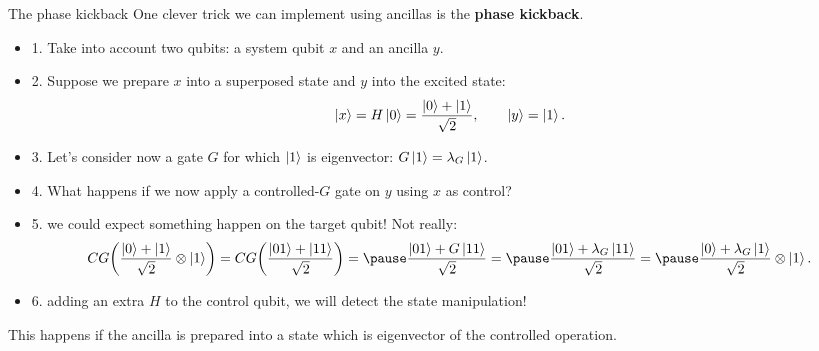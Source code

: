 \documentclass[aspectratio=169, 8pt, xcolor={svgnames}, hyperref={linkcolor=black}]{beamer}
\begin{document}
\begin{frame}{The phase kickback}
One clever trick we can implement using ancillas is the \textbf{phase kickback}.
\pause

\begin{itemize}[noitemsep]
\item{1.} Take into account two qubits: a system qubit $x$ and an ancilla $y$.  \pause
\item{2.} Suppose we prepare $x$ into a superposed state and $y$ into the excited state:
$$ \ket{x}=H\ket{0} = \frac{\ket{0}+\ket{1}}{\sqrt{2}}, \qquad \ket{y}=\ket{1}. $$ \pause
\item{3.} Let's consider now a gate $G$ for which $\ket{1}$ is eigenvector: $G\ket{1}=\lambda_G \ket{1}$. \pause
\item{4.} What happens if we now apply a controlled-$G$ gate on $y$ using $x$ as control? \pause
\item{5.} we could expect something happen on the target qubit! Not really: \pause
$$ CG \biggl( \frac{\ket{0}+\ket{1}}{\sqrt{2}} \otimes \ket{1} \biggr)  = 
CG \biggl( \frac{\ket{01}+\ket{11}}{\sqrt{2}} \biggr) = \pause
\frac{\ket{01}+G\ket{11}}{\sqrt{2}} = \pause
\frac{\ket{01}+\lambda_G \ket{11}}{\sqrt{2}} = \pause
\frac{\ket{0}+\lambda_G \ket{1}}{\sqrt{2}} \otimes \ket{1}.
$$ \pause
\item{6.} adding an extra $H$ to the control qubit, we will detect the state manipulation!
\end{itemize}

\pause
\begin{tcolorbox}[colback=red!15, title=Important]
This happens if the ancilla is prepared into a state which is eigenvector of the 
controlled operation.
\end{tcolorbox}

\end{frame}
\end{document}

